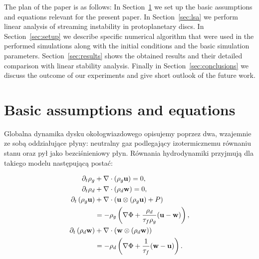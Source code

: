 The plan of the paper is as follows: In Section~\ref{sec:eqs} we set up the
basic assumptions and equations relevant for the present paper. In
Section~\ref{sec:lsa} we perform linear analysis of streaming instability in
protoplanetary discs. In Section~\ref{sec:setup} we describe specific numerical
algorithm that were used in the performed simulations along with the initial
conditions and the basic simulation parameters. Section~\ref{sec:results} shows
the obtained results and their detailed comparison with linear stability
analysis.  Finally in Section~\ref{sec:conclusions} we discuss the outcome of
our experiments and give short outlook of the future work.

\section{Basic assumptions and equations}
\label{sec:eqs}
Globalna dynamika dysku okołogwiazdowego opisujemy poprzez dwa, wzajemnie ze
sobą oddziałujące płyny: neutralny gaz podlegający izotermicznemu równaniu
stanu oraz pył jako bezciśnieniowy płyn. Równania hydrodynamiki przyjmują dla
takiego modelu następującą postać:

\begin{align}
\partial_t \rho_g &+ \nabla\cdot\left(\rho_g\mathbf{u}\right) = 0,\\
\partial_t \rho_d &+ \nabla\cdot\left(\rho_d\mathbf{w}\right) = 0,\\
\partial_t \left(\rho_g\mathbf{u}\right) &+
   \nabla\cdot(\mathbf{u}\otimes(\rho_g\mathbf{u})+P) \notag\\
 &= -\rho_g\left(\nabla\Phi +
\frac{\rho_d}{\tau_f\rho_g}(\mathbf{u}-\mathbf{w})\right),\label{eq3}\\
\partial_t \left(\rho_d\mathbf{w}\right) &+
\nabla\cdot(\mathbf{w}\otimes(\rho_d\mathbf{w})) \notag\\
 &= -\rho_d\left(\nabla\Phi + \frac{1}{\tau_f}(\mathbf{w}-\mathbf{u})\right)
\label{eq4}.
\end{align}

